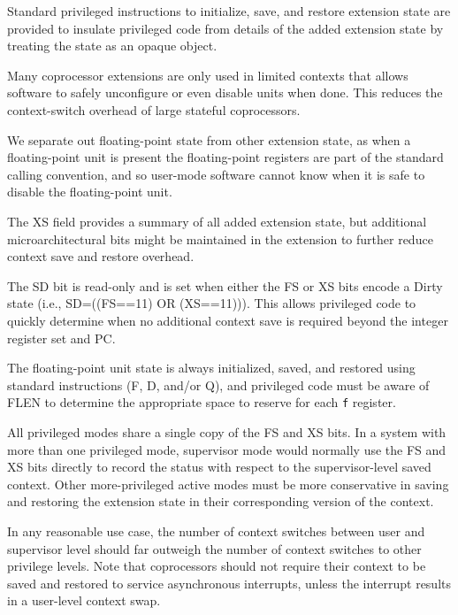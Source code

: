 Standard privileged instructions to initialize, save, and restore
extension state are provided to insulate privileged code from details
of the added extension state by treating the state as an opaque
object.

\begin{commentary}
Many coprocessor extensions are only used in limited contexts that
allows software to safely unconfigure or even disable units when done.
This reduces the context-switch overhead of large stateful
coprocessors.

We separate out floating-point state from other extension state, as
when a floating-point unit is present the floating-point registers are
part of the standard calling convention, and so user-mode software
cannot know when it is safe to disable the floating-point unit.
\end{commentary}

The XS field provides a summary of all added extension state, but
additional microarchitectural bits might be maintained in the
extension to further reduce context save and restore overhead.

The SD bit is read-only and is set when either the FS or XS bits
encode a Dirty state (i.e., SD=((FS==11) OR (XS==11))).  This allows
privileged code to quickly determine when no additional context save is
required beyond the integer register set and PC.

The floating-point unit state is always initialized, saved, and
restored using standard instructions (F, D, and/or Q), and privileged
code must be aware of FLEN to determine the appropriate space to
reserve for each {\tt f} register.

All privileged modes share a single copy of the FS and XS bits.  In a
system with more than one privileged mode, supervisor mode would
normally use the FS and XS bits directly to record the status with
respect to the supervisor-level saved context.  Other more-privileged
active modes must be more conservative in saving and restoring the
extension state in their corresponding version of the context.

\begin{commentary}
In any reasonable use case, the number of context switches between
user and supervisor level should far outweigh the number of context
switches to other privilege levels.  Note that coprocessors should not
require their context to be saved and restored to service asynchronous
interrupts, unless the interrupt results in a user-level context swap.
\end{commentary}

